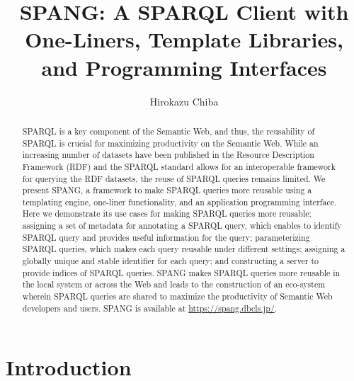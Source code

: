 \documentclass[runningheads]{llncs}
\begin{document}
\title{SPANG: A SPARQL Client with One-Liners, Template Libraries, and Programming Interfaces}
\author{Hirokazu Chiba}
%
\maketitle              %
%
\begin{abstract}
SPARQL is a key component of the Semantic Web, and thus, the reusability of SPARQL is crucial for maximizing productivity on the Semantic Web.
While an increasing number of datasets have been published in the Resource Description Framework (RDF) and the SPARQL standard allows for an interoperable framework for querying the RDF datasets, the reuse of SPARQL queries remains limited. We present SPANG, a framework to make SPARQL queries more reusable using a templating engine, one-liner functionality, and an application programming interface. Here we demonstrate its use cases for making SPARQL queries more reusable; assigning a set of metadata for annotating a SPARQL query, which enables to identify SPARQL query and provides useful information for the query; parameterizing SPARQL queries, which makes each query reusable under different settings; assigning a globally unique and stable identifier for each query; and constructing a server to provide indices of SPARQL queries. SPANG makes SPARQL queries more reusable in the local system or across the Web and leads to the construction of an eco-system wherein SPARQL queries are shared to maximize the productivity of Semantic Web developers and users. SPANG is available at \url{https://spang.dbcls.jp/}.


\end{abstract}


\section{Introduction}
\end{document}
